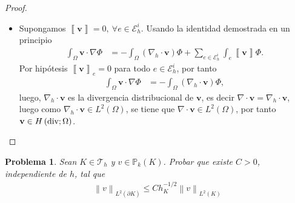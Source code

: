 \documentclass[10pt,a4paper]{report}
\newtheorem{pro}{Problema}
\newcommand{\Hdiv}{H\left(\textup{div};\Omega\right)}
\providecommand{\norm}[1]{\left\lVert#1\right\rVert}
\providecommand{\salto}[1]{\left\llbracket#1\right\rrbracket}
\begin{document}
\begin{proof}
\begin{itemize}
\begin{itemize}
\begin{align*}
            \end{align*}
            esto vale para cualquier $\varPhi\in C^{\infty}_{0}\left(\Omega\right)$, en particular para $\varPhi_{\hat{e}}\in C^{\infty}_{0}\left(\Omega\right)$ con soporte en $\hat{e}$, donde $\hat{e}$ es una arista interior arbitraria, luego
            \begin{align*}
            	\int_{\hat{e}}\salto{\textbf{v}}\varPhi_{\hat{e}} = 0, 
            \end{align*}
            luego, usando el hecho que $\varPhi_{\hat{e}}$ es una función test arbitraria con soporte en $\hat{e}$, se deduce que necesariamente $\salto{\textbf{v}}_{e} = 0$ para todo $e\in \mathscr{E}^{i}_{h}$. 
        	\item[$(\Longleftarrow)$] Supongamos $\salto{\textbf{v}} = 0,\ \forall e\in \mathscr{E}^{i}_{h}$. Usando la identidad demostrada en un principio
        	\begin{align*}
        		\int_{\Omega}\textbf{v}\cdot\nabla\varPhi &= -\int_{\Omega}\left(\nabla_{h}\cdot \textbf{v}\right)\varPhi + \sum_{e\in \mathscr{E}^{i}_{h}}\int_{e}\salto{\textbf{v}}\varPhi.
        	\end{align*}
            Por hipótesis  $\salto{\textbf{v}}_{e} = 0$ para todo $e\in \mathscr{E}^{i}_{h}$, por tanto
            \begin{align*}
            	\int_{\Omega}\textbf{v}\cdot\nabla\varPhi &= -\int_{\Omega}\left(\nabla_{h}\cdot \textbf{v}\right)\varPhi,
            \end{align*}
            luego, $\nabla_{h}\cdot \textbf{v}$ es la divergencia distribucional de $\textbf{v}$, es decir $\nabla\cdot \textbf{v} = \nabla_{h}\cdot \textbf{v}$, luego como $\nabla_{h}\cdot \textbf{v}\in L^{2}\left(\Omega\right)$, se tiene que $\nabla\cdot \textbf{v}\in L^{2}\left(\Omega\right)$, por tanto $\textbf{v}\in \Hdiv$.
        \end{itemize}
    	\end{itemize}
    \end{proof}
    \newpage
    \begin{pro}
    	Sean $K\in \mathscr{T}_{h}$ y $v\in \mathbb{P}_{k}(K)$. Probar que existe $C>0$, independiente de $h$, tal que 
    	\begin{align*}
    		\norm{v}_{L^{2}(\partial K)} \leq Ch^{-1/2}_{K}\norm{v}_{L^{2}(K)}
    	\end{align*}
    \end{pro}
\end{document}
